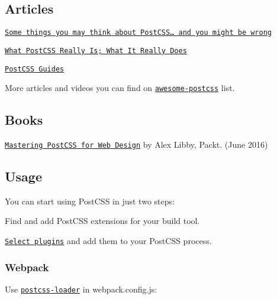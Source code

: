 \subsection*{Articles}


\begin{DoxyItemize}
\item \href{http://julian.io/some-things-you-may-think-about-postcss-and-you-might-be-wrong}{\tt Some things you may think about Post\+C\+S\+S… and you might be wrong}
\item \href{http://davidtheclark.com/its-time-for-everyone-to-learn-about-postcss}{\tt What Post\+C\+SS Really Is; What It Really Does}
\item \href{http://webdesign.tutsplus.com/series/postcss-deep-dive--cms-889}{\tt Post\+C\+SS Guides}
\end{DoxyItemize}

More articles and videos you can find on \href{https://github.com/jjaderg/awesome-postcss}{\tt awesome-\/postcss} list.

\subsection*{Books}


\begin{DoxyItemize}
\item \href{https://www.packtpub.com/web-development/mastering-postcss-web-design}{\tt Mastering Post\+C\+SS for Web Design} by Alex Libby, Packt. (June 2016)
\end{DoxyItemize}

\subsection*{Usage}

You can start using Post\+C\+SS in just two steps\+:


\begin{DoxyEnumerate}
\item Find and add Post\+C\+SS extensions for your build tool.
\item \href{http://postcss.parts}{\tt Select plugins} and add them to your Post\+C\+SS process.
\end{DoxyEnumerate}

\subsubsection*{Webpack}

Use \href{https://github.com/postcss/postcss-loader}{\tt {\ttfamily postcss-\/loader}} in {\ttfamily webpack.\+config.\+js}\+:


